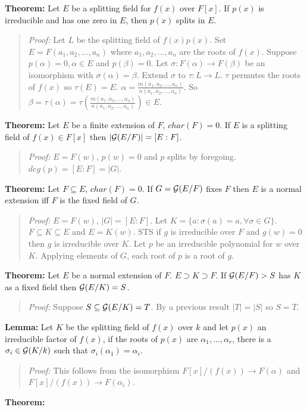 {\bf Theorem:} 
Let $E$ be a splitting field for $f(x)$ over $F[x]$.
If $p(x)$ is irreducible and has one zero in $E$, then $p(x)$ splits in
$E$.
\begin{quote}
\emph{Proof:} 
Let $L$ be the splitting field of $f(x)p(x)$.
Set $E= F(a_1,a_2, \ldots, a_n)$
where $a_1, a_2, \ldots , a_n$ are the roots of $f(x)$.
Suppose $p(\alpha)=0, \alpha \in E$ and $p(\beta)= 0$.
Let $\sigma: F(\alpha) \rightarrow F(\beta)$ be an isomorphism with
$\sigma(\alpha)=\beta$.
Extend $\sigma$ to $\tau: L \rightarrow L$.  $\tau$
permutes the roots of $f(x)$ so $\tau(E)= E$.
$\alpha= {\frac {m(a_1, a_2, \ldots , a_n)} {n(a_1, a_2, \ldots , a_n)}}$.
So $\beta= \tau(\alpha)= \tau({\frac {m(a_1, a_2, \ldots , a_n)}
{n(a_1, a_2, \ldots , a_n)}}) \in E$.
\end{quote}
{\bf Theorem:} 
Let $E$ be a finite extension of $F$, $char(F)=0$.  If $E$ is a splitting
field of $f(x) \in F[x]$
then $|{\cal G}(E/F)| = [E:F]$.
\begin{quote}
\emph{Proof:} $E=F(w)$, $p(w)=0$ and $p$ splits by foregoing. $deg(p)=[E:F]=|G|$.
\end{quote}
{\bf Theorem:} 
Let $F \subseteq E$, $char(F)=0$.  If $G={\cal G}(E/F)$ fixes $F$ then $E$ is
a normal extension iff $F$ is the fixed field of $G$.
\begin{quote}
\emph{Proof:} $E=F(w)$, $|G|=[E:F]$.  Let $K= \{ a: \sigma(a)=a, \forall \sigma \in G\}$.
$F \subseteq K \subseteq E$ and $E=K(w)$.  STS if $g$ is irreducible
over $F$ and $g(w)=0$ then $g$
is irreducible over $K$.  Let $p$ be an irreducible polynomial for $w$ over $K$.  Applying
elements of $G$, each root of $p$ is a root of $g$.
\end{quote}
{\bf Theorem:} 
Let $E$ be a normal extension of $F$. $E \supset K \supset F$.  If
${\cal G}(E/F)>S$ has $K$ as a fixed field then ${\cal G}(E/K)=S$.
\begin{quote}
\emph{Proof:} 
Suppose $S \subseteq {\cal G}(E/K)=T$.  By a previous result $|T|=|S|$ so $S=T$.
\end{quote}
{\bf Lemma:} Let $K$ be the splitting field of $f(x)$ over $k$
and let $p(x)$ an irreducible
factor of $f(x)$, if the roots of $p(x)$ are $\alpha_1 , \ldots , \alpha_r$,
there is a $\sigma_i \in {\cal G}(K/k)$ such that $\sigma_i(\alpha_1)= \alpha_i$.
\begin{quote}
\emph{Proof:} 
This follows from the isomorphism $F[x]/(f(x)) \rightarrow F(\alpha )$ and
$F[x]/(f(x)) \rightarrow F(\alpha_i )$.
\end{quote}
{\bf Theorem:} 
